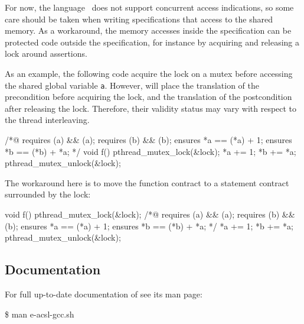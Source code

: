 For now, the \eacsl language~\cite{eacsl} does not support concurrent access
indications, so some care should be taken when writing specifications that
access to the shared memory. As a workaround, the memory accesses inside the
specification can be protected code outside the specification, for instance by
acquiring and releasing a lock around \eacsl assertions.

As an example, the following code acquire the lock on a mutex before accessing
the shared global variable \texttt{a}. However, \eacsl will place the
translation of the precondition before acquiring the lock, and the translation
of the postcondition after releasing the lock. Therefore, their validity status
may vary with respect to the thread interleaving.

\begin{minipage}{\linewidth}
\begin{ccode}
/*@ requires \valid(a) && \initialized(a);
    requires \valid(b) && \initialized(b);
    ensures *a == \old(*a) + 1;
    ensures *b == \old(*b) + *a; */
void f() {
  pthread_mutex_lock(&lock);
  *a += 1;
  *b += *a;
  pthread_mutex_unlock(&lock);
}
\end{ccode}
\end{minipage}

The workaround here is to move the function contract to a statement contract
surrounded by the lock:

\begin{minipage}{\linewidth}
\begin{ccode}
void f() {
  pthread_mutex_lock(&lock);
  /*@ requires \valid(a) && \initialized(a);
      requires \valid(b) && \initialized(b);
      ensures *a == \old(*a) + 1;
      ensures *b == \old(*b) + *a; */
  {
    *a += 1;
    *b += *a;
  }
  pthread_mutex_unlock(&lock);
}
\end{ccode}
\end{minipage}

\subsection{Documentation}\label{sec:eacsl-gcc:doc}

For full up-to-date documentation of \eacslgcc see its man page:

\begin{shell}
\$ man e-acsl-gcc.sh
\end{shell}

